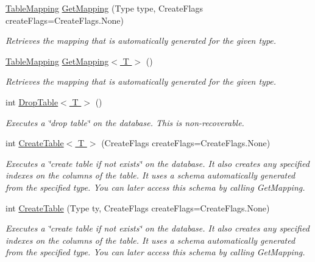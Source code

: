 \begin{DoxyCompactItemize}
\item 
\hyperlink{classSQLite_1_1TableMapping}{Table\+Mapping} \hyperlink{classSQLite_1_1SQLiteConnection_a0c0db552a653e0797cf772706148eb41}{Get\+Mapping} (Type type, Create\+Flags create\+Flags=Create\+Flags.\+None)
\begin{DoxyCompactList}\small\item\em Retrieves the mapping that is automatically generated for the given type. \end{DoxyCompactList}\item 
\hyperlink{classSQLite_1_1TableMapping}{Table\+Mapping} \hyperlink{classSQLite_1_1SQLiteConnection_adf0ed08567e1ca36e4fda72c94ede544}{Get\+Mapping$<$ T $>$} ()
\begin{DoxyCompactList}\small\item\em Retrieves the mapping that is automatically generated for the given type. \end{DoxyCompactList}\item 
int \hyperlink{classSQLite_1_1SQLiteConnection_a783032226b2db2ebd6417f21abe9cd5a}{Drop\+Table$<$ T $>$} ()
\begin{DoxyCompactList}\small\item\em Executes a \char`\"{}drop table\char`\"{} on the database. This is non-\/recoverable. \end{DoxyCompactList}\item 
int \hyperlink{classSQLite_1_1SQLiteConnection_abc8fda93774fb74dd2f97e9549eb46b5}{Create\+Table$<$ T $>$} (Create\+Flags create\+Flags=Create\+Flags.\+None)
\begin{DoxyCompactList}\small\item\em Executes a \char`\"{}create table if not exists\char`\"{} on the database. It also creates any specified indexes on the columns of the table. It uses a schema automatically generated from the specified type. You can later access this schema by calling Get\+Mapping. \end{DoxyCompactList}\item 
int \hyperlink{classSQLite_1_1SQLiteConnection_abfd7ba959c93db259983427b5e7ee05a}{Create\+Table} (Type ty, Create\+Flags create\+Flags=Create\+Flags.\+None)
\begin{DoxyCompactList}\small\item\em Executes a \char`\"{}create table if not exists\char`\"{} on the database. It also creates any specified indexes on the columns of the table. It uses a schema automatically generated from the specified type. You can later access this schema by calling Get\+Mapping. \end{DoxyCompactList}\item 

\end{DoxyCompactItemize}
